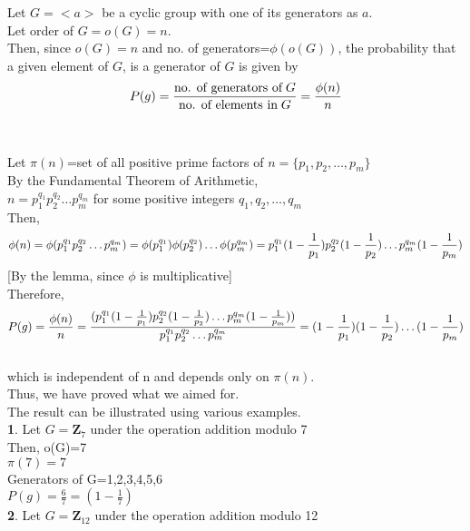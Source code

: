 \documentclass{article}
\begin{document}
Let $G=<a>$ be a cyclic group with one of its generators as $a$.\\
Let order of $G = o(G)=n.$\\ 
Then, since $o(G)=n$ and no. of generators=$\phi (o(G))$, the probability that a given element of $G$, is a generator of $G$ is given by
$$P(g) = \frac{\textnormal{no. of generators of}\; G}{\textnormal{no. of elements in}\; G}\\
       =\frac{\phi (n)}{n} $$\\                                                     \\
Let $\pi(n)$=set of all positive prime factors of $n = \{ p_1,p_2,\ldots,p_m\}$\\
By the Fundamental Theorem of Arithmetic,\\
$n=p_1^{q_1} p_2^{q_2}\ldots p_m^{q_m}$ for some positive integers $q_1,q_2,\ldots,q_m$\\
Then, $$\phi (n) = \phi (p_1^{q_1} p_2^{q_2}\ldots p_m^{q_m})
\newline
                 = \phi (p_1^{q_1}) \phi(p_2^{q_2})\ldots \phi(p_m^{q_m})
                 \newline
			     = p_1^{q_1}(1-\frac{1}{p_1}) p_2^{q_2}(1-\frac{1}{p_2}) \ldots p_m^{q_m}(1-\frac{1}{p_m})$$
			     \hspace{6cm} [By the lemma, since $\phi$ is multiplicative]\\
Therefore,\\
$$P(g) =\frac{\phi (n)}{n}\\
            = \frac{(p_1^{q_1}(1-\frac{1}{p_1}) p_2^{q_2}(1-\frac{1}{p_2})\ldots p_m^{q_m}(1-\frac{1}{p_m}))}{p_1^{q_1} p_2^{q_2} \ldots p_m^{q_m}}\\
            = (1-\frac{1}{p_1})(1-\frac{1}{p_2})\ldots (1-\frac{1}{p_m})$$\\
which is independent of n and depends only on $\pi (n)$.\\
Thus, we have proved what we aimed for.\\
\bigbreak
\noindent The result can be illustrated using various examples.\\
\noindent \textbf{1}. Let $G=\mathbf{Z}_7$ under the operation addition modulo 7\\
Then, o(G)=7\\
$\pi (7)={7}$\\
Generators of G={1,2,3,4,5,6}\\
$P(g)=\frac{6}{7} = (1-\frac{1}{7})$\\
\bigbreak
\noindent \textbf{2}. Let $G=\mathbf{Z}_{12}$ under the operation addition modulo 12\\
\end{document}
